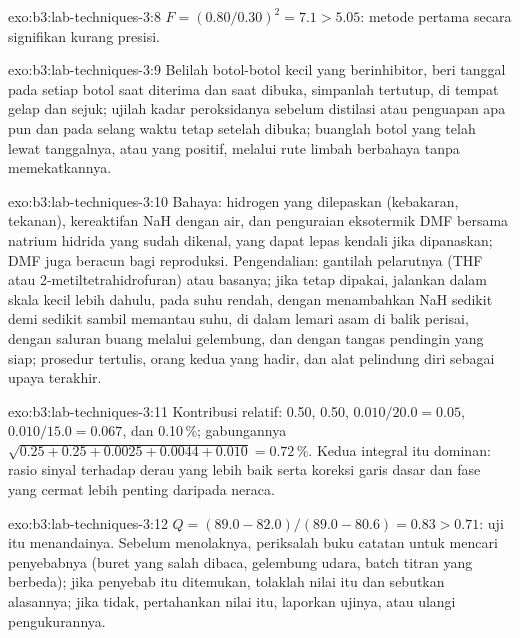 \begin{solution}{exo:b3:lab-techniques-3:8}
$F = (0.80/0.30)^2 = 7.1 > 5.05$: metode pertama secara signifikan kurang presisi.
\end{solution}

\begin{solution}{exo:b3:lab-techniques-3:9}
Belilah botol-botol kecil yang berinhibitor, beri tanggal pada setiap botol saat diterima dan saat dibuka, simpanlah
tertutup, di tempat gelap dan sejuk; ujilah kadar peroksidanya sebelum distilasi atau penguapan apa pun
dan pada selang waktu tetap setelah dibuka; buanglah botol yang telah lewat tanggalnya, atau yang
positif, melalui rute limbah berbahaya tanpa memekatkannya.
\end{solution}

\begin{solution}{exo:b3:lab-techniques-3:10}
Bahaya: hidrogen yang dilepaskan (kebakaran, tekanan), kereaktifan NaH dengan air,
dan penguraian eksotermik DMF bersama natrium hidrida yang sudah dikenal, yang dapat lepas kendali
jika dipanaskan; DMF juga beracun bagi reproduksi. Pengendalian: gantilah pelarutnya
(THF atau 2-metiltetrahidrofuran) atau basanya; jika tetap dipakai, jalankan dalam skala kecil lebih dahulu, pada suhu
rendah, dengan menambahkan NaH sedikit demi sedikit sambil memantau suhu, di dalam lemari asam
di balik perisai, dengan saluran buang melalui gelembung, dan dengan tangas pendingin yang siap; prosedur
tertulis, orang kedua yang hadir, dan alat pelindung diri sebagai upaya terakhir.
\end{solution}

\begin{solution}{exo:b3:lab-techniques-3:11}
Kontribusi relatif: 0.50, 0.50, $0.010/20.0 = 0.05$, $0.010/15.0 = 0.067$, dan 0.10\,\%; gabungannya
$\sqrt{0.25 + 0.25 + 0.0025 + 0.0044 + 0.010} = 0.72$\,\%. Kedua integral itu dominan: rasio sinyal terhadap derau yang lebih baik serta
koreksi garis dasar dan fase yang cermat lebih penting daripada neraca.
\end{solution}

\begin{solution}{exo:b3:lab-techniques-3:12}
$Q = (89.0 - 82.0)/(89.0 - 80.6) = 0.83 > 0.71$: uji itu menandainya. Sebelum menolaknya, periksalah buku catatan
untuk mencari penyebabnya (buret yang salah dibaca, gelembung udara, batch titran yang berbeda); jika penyebab itu
ditemukan, tolaklah nilai itu dan sebutkan alasannya; jika tidak, pertahankan nilai itu, laporkan ujinya, atau ulangi
pengukurannya.
\end{solution}

